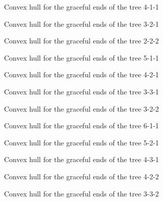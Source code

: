\documentclass{article}
\begin{document}
\begin{figure}[H]
	\center
	
                \caption{Convex hull for the graceful ends of the tree 4-1-1}
\end{figure}
\begin{figure}[H]
	\center
	
                \caption{Convex hull for the graceful ends of the tree 3-2-1}
\end{figure}
\begin{figure}[H]
	\center
	
                \caption{Convex hull for the graceful ends of the tree 2-2-2}
\end{figure}
\begin{figure}[H]
	\center
	
                \caption{Convex hull for the graceful ends of the tree 5-1-1}
\end{figure}
\begin{figure}[H]
	\center
	
                \caption{Convex hull for the graceful ends of the tree 4-2-1}
\end{figure}
\begin{figure}[H]
	\center
	
                \caption{Convex hull for the graceful ends of the tree 3-3-1}
\end{figure}
\begin{figure}[H]
	\center
	
                \caption{Convex hull for the graceful ends of the tree 3-2-2}
\end{figure}
\begin{figure}[H]
	\center
	
                \caption{Convex hull for the graceful ends of the tree 6-1-1}
\end{figure}
\begin{figure}[H]
	\center
	
                \caption{Convex hull for the graceful ends of the tree 5-2-1}
\end{figure}
\begin{figure}[H]
	\center
	
                \caption{Convex hull for the graceful ends of the tree 4-3-1}
\end{figure}
\begin{figure}[H]
	\center
	
                \caption{Convex hull for the graceful ends of the tree 4-2-2}
\end{figure}
\begin{figure}[H]
	\center
	
                \caption{Convex hull for the graceful ends of the tree 3-3-2}
\end{figure}
\end{document}
